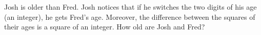 Josh is older than Fred. Josh notices that if he switches the two digits of his age (an integer), he gets Fred’s age. Moreover, the difference between the squares of their ages is a square of an integer. How old are Josh and Fred?